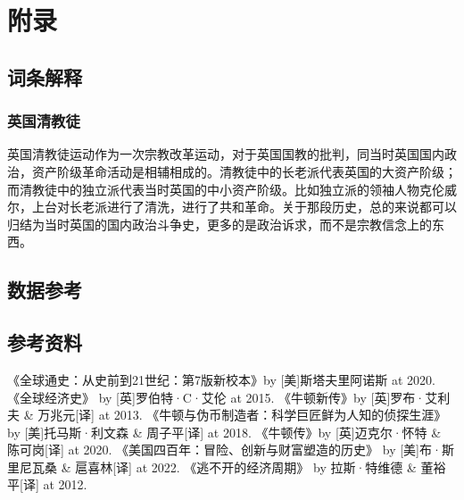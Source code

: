 \documentclass[12pt,oneside]{book}
\begin{document}
\appendix
\part{附录}
\chapter{词条解释}
\section{英国清教徒}
英国清教徒运动作为一次宗教改革运动，对于英国国教的批判，同当时英国国内政治，资产阶级革命活动是相辅相成的。清教徒中的长老派代表英国的大资产阶级；而清教徒中的独立派代表当时英国的中小资产阶级。比如独立派的领袖人物克伦威尔，上台对长老派进行了清洗，进行了共和革命。关于那段历史，总的来说都可以归结为当时英国的国内政治斗争史，更多的是政治诉求，而不是宗教信念上的东西。


\chapter{数据参考}



\backmatter
\chapter*{参考资料}
\begin{thebibliography}{99}
 《全球通史：从史前到21世纪：第7版新校本》by [美]斯塔夫里阿诺斯 at 2020.
 《全球经济史》 by [英]罗伯特·C·艾伦 at 2015.
 《牛顿新传》by [英]罗布·艾利夫 \& 万兆元[译] at 2013.
 《牛顿与伪币制造者：科学巨匠鲜为人知的侦探生涯》by [美]托马斯·利文森 \& 周子平[译] at 2018. 
 《牛顿传》by [英]迈克尔·怀特 \& 陈可岗[译] at 2020.
 《美国四百年：冒险、创新与财富塑造的历史》 by [美]布·斯里尼瓦桑 \& 扈喜林[译] at 2022.
 《逃不开的经济周期》 by 拉斯·特维德 \& 董裕平[译] at 2012.
\end{thebibliography}
\end{document}
